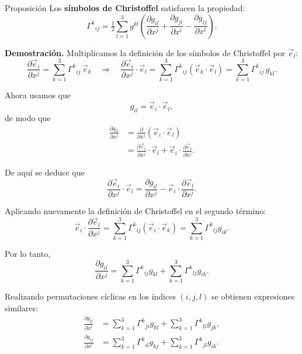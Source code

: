 \documentclass[../apunte_mecanica_clasica.tex]{subfiles}%
\begin{document}
\begin{apuntebloque}{Proposición}
Los \textbf{símbolos de Christoffel} satisfacen la propiedad:
\begin{equation*}
    \Gamma^k{}_{ij} = \tfrac{1}{2} \sum_{l=1}^3 g^{kl} 
    \left( \frac{\partial g_{il}}{\partial x^j} 
         + \frac{\partial g_{jl}}{\partial x^i} 
         - \frac{\partial g_{ij}}{\partial x^l} \right).
\end{equation*}

\textbf{Demostración.}  
Multiplicamos la definición de los símbolos de Christoffel por $\vec{e}_l$:
\begin{equation*}
    \frac{\partial \vec{e}_i}{\partial x^j} 
    = \sum_{k=1}^3 \Gamma^k{}_{ij}\,\vec{e}_k
    \quad \Longrightarrow \quad
    \frac{\partial \vec{e}_i}{\partial x^j}\cdot \vec{e}_l
    = \sum_{k=1}^3 \Gamma^k{}_{ij} (\vec{e}_k \cdot \vec{e}_l)
    = \sum_{k=1}^3 \Gamma^k{}_{ij}\, g_{kl}.
\end{equation*}

Ahora usamos que
\[
    g_{il} = \vec{e}_i \cdot \vec{e}_l,
\]
de modo que
\begin{align*}
    \frac{\partial g_{il}}{\partial x^j} 
    &= \frac{\partial}{\partial x^j}(\vec{e}_i \cdot \vec{e}_l) \\[4pt]
    &= \frac{\partial \vec{e}_i}{\partial x^j}\cdot \vec{e}_l 
       + \vec{e}_i \cdot \frac{\partial \vec{e}_l}{\partial x^j}.
\end{align*}

De aquí se deduce que
\begin{equation*}
    \frac{\partial \vec{e}_i}{\partial x^j}\cdot \vec{e}_l
    = \frac{\partial g_{il}}{\partial x^j} 
      - \vec{e}_i \cdot \frac{\partial \vec{e}_l}{\partial x^j}.
\end{equation*}

Aplicando nuevamente la definición de Christoffel en el segundo término:
\begin{equation*}
    \vec{e}_i \cdot \frac{\partial \vec{e}_l}{\partial x^j}
    = \sum_{k=1}^3 \Gamma^k{}_{lj} (\vec{e}_i \cdot \vec{e}_k)
    = \sum_{k=1}^3 \Gamma^k{}_{lj} g_{ik}.
\end{equation*}

Por lo tanto,
\begin{equation*}
    \frac{\partial g_{il}}{\partial x^j} 
    = \sum_{k=1}^3 \Gamma^k{}_{ij} g_{kl} 
      + \sum_{k=1}^3 \Gamma^k{}_{lj} g_{ik}.
\end{equation*}

Realizando permutaciones cíclicas en los índices $(i,j,l)$ se obtienen expresiones similares:
\begin{align*}
    \frac{\partial g_{jl}}{\partial x^i} 
    &= \sum_{k=1}^3 \Gamma^k{}_{ji} g_{kl} 
      + \sum_{k=1}^3 \Gamma^k{}_{li} g_{jk}, \\[6pt]
    \frac{\partial g_{ij}}{\partial x^l} 
    &= \sum_{k=1}^3 \Gamma^k{}_{il} g_{kj} 
      + \sum_{k=1}^3 \Gamma^k{}_{jl} g_{ik}.
\end{align*}


\end{apuntebloque}
\end{document}

